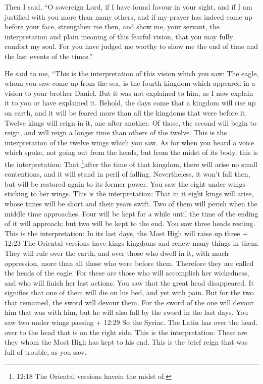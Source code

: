  Then I said, ``O sovereign Lord, if I have found favour in
your sight, and if I am justified with you more than many others, and if
my prayer has indeed come up before your face,  strengthen
me then, and show me, your servant, the interpretation and plain meaning
of this fearful vision, that you may fully comfort my soul. 
For you have judged me worthy to show me the end of time and the last
events of the times.''

 He said to me, ``This is the interpretation of this vision
which you saw:  The eagle, whom you saw come up from the
sea, is the fourth kingdom which appeared in a vision to your brother
Daniel.  But it was not explained to him, as I now explain
it to you or have explained it.  Behold, the days come that
a kingdom will rise up on earth, and it will be feared more than all the
kingdoms that were before it.  Twelve kings will reign in
it, one after another.  Of those, the second will begin to
reign, and will reign a longer time than others of the twelve.
 This is the interpretation of the twelve wings which you
saw.  As for when you heard a voice which spoke, not going
out from the heads, but from the midst of its body, this is the
interpretation:  That \footnote{12:18 The Oriental versions
  havein the midst of.}after the time of that kingdom, there will arise
no small contentions, and it will stand in peril of falling.
Nevertheless, it won't fall then, but will be restored again to its
former power.  You saw the eight under wings sticking to
her wings. This is the interpretation:  That in it eight
kings will arise, whose times will be short and their years swift.
 Two of them will perish when the middle time approaches.
Four will be kept for a while until the time of the ending of it will
approach; but two will be kept to the end.  You saw three
heads resting. This is the interpretation:  In its last
days, the Most High will raise up three + 12:23 The Oriental versions
have kings kingdoms and renew many things in them. They will rule over
the earth,  and over those who dwell in it, with much
oppression, more than all those who were before them. Therefore they are
called the heads of the eagle.  For these are those who
will accomplish her wickedness, and who will finish her last actions.
 You saw that the great head disappeared. It signifies that
one of them will die on his bed, and yet with pain.  But
for the two that remained, the sword will devour them.  For
the sword of the one will devour him that was with him, but he will also
fall by the sword in the last days.  You saw two under
wings passing + 12:29 So the Syriac. The Latin has over the head. over
to the head that is on the right side.  This is the
interpretation: These are they whom the Most High has kept to his end.
This is the brief reign that was full of trouble, as you saw.

